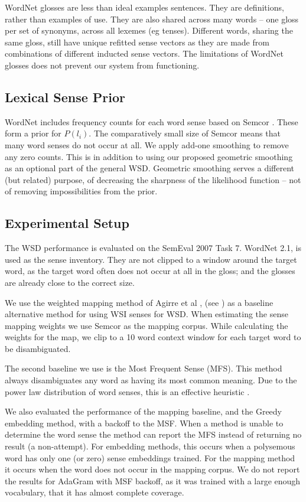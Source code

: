 \documentclass{article}
\def\parencite{\cite}
\begin{document}
WordNet glosses are less than ideal examples sentences.
They are definitions, rather than examples of use.
They are also shared across many words -- one gloss per set of synonyms, across all lexemes (eg tenses).
Different words, sharing the same gloss, still have unique refitted sense vectors as they are made from combinations of different inducted sense vectors.
The limitations of WordNet glosses does not prevent our system from functioning.

\subsection{Lexical Sense Prior}
WordNet includes frequency counts for each word sense based on Semcor \parencite{tengi1998design}.
These form a prior for $P(l_i)$.
The comparatively small size of Semcor means that many word senses do not occur at all.
We apply add-one smoothing to remove any zero counts.
This is in addition to using our proposed geometric smoothing as an optional part of the general WSD.
Geometric smoothing serves a different (but related) purpose, of decreasing the sharpness of the likelihood function -- not of removing impossibilities from the prior.

\subsection {Experimental Setup}
The WSD performance is evaluated on the SemEval 2007 Task 7. 
WordNet 2.1, is used as the sense inventory.
They are not clipped to a window around the target word, as the target word often does not occur at all in the gloss; and the glosses are already close to the correct size.

We use the weighted mapping method of Agirre et al , (see ) as a baseline alternative method for using WSI senses for WSD.
When estimating the sense mapping weights we use Semcor as the mapping corpus.
While calculating the weights for the map, we clip to a 10 word context window for each target word to be disambiguated.

The second baseline we use is the Most Frequent Sense (MFS).
This method always disambiguates any word as having its  most common meaning.
Due to the power law distribution of word senses, this is an effective heuristic \parencite{Kilgarriff2004}.

We also evaluated the performance of the mapping baseline, and the Greedy embedding method, with a backoff to the MSF.
When a method is unable to determine the word sense the method can report the MFS instead of returning no result (a non-attempt).
For embedding methods, this occurs when a polysemous word has only one (or zero) sense embeddings trained.
For the mapping method it occurs when the word does not occur in the mapping corpus.
We do not report the results for AdaGram with MSF backoff, as it was trained with a large enough vocabulary, that it has almost complete coverage.
\end{document}
